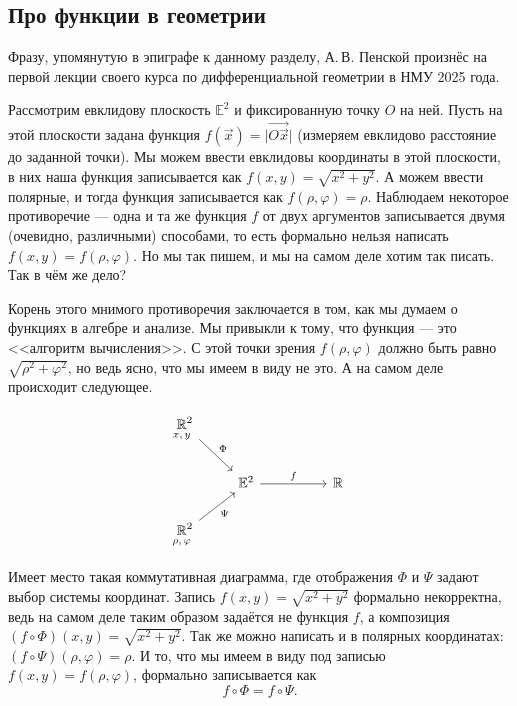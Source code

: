 \subsection{Про функции в геометрии}

Фразу, упомянутую в эпиграфе к данному разделу, А.\,В. Пенской произнёс на первой лекции своего курса по дифференциальной геометрии в НМУ 2025 года.

Рассмотрим евклидову плоскость\footnotemark{} $\mathbb{E}^2$ и фиксированную точку $O$ на ней. Пусть на этой плоскости задана функция $f(\vec{x}) = \big|\overrightarrow{O\vec{x}}\big|$ (измеряем евклидово расстояние до заданной точки). Мы можем ввести евклидовы координаты в этой плоскости, в них наша функция записывается как $f(x, y) = \sqrt{x^2 + y^2}$. А можем ввести полярные, и тогда функция записывается как $f(\rho, \varphi) = \rho$. Наблюдаем некоторое противоречие --- одна и та же функция $f$ от двух аргументов записывается двумя (очевидно, различными) способами, то есть формально нельзя написать $f(x, y) = f(\rho, \varphi)$. Но мы так пишем, и мы на самом деле хотим так писать. Так в чём же дело?


Корень этого мнимого противоречия заключается в том, как мы думаем о функциях в алгебре и анализе. Мы привыкли к тому, что функция --- это <<алгоритм вычисления>>. С этой точки зрения $f(\rho, \varphi)$ должно быть равно $\sqrt{\rho^2 + \varphi^2}$, но ведь ясно, что мы имеем в виду не это. А на самом деле происходит следующее.

%
\[\begin{tikzcd}
	{\underset{\mathclap{x,\,y}}{\mathbb{R}}^2} \\
	& {\mathbb{E}^2} && {\mathbb{R}} \\
	{\underset{\mathclap{\rho,\,\varphi}}{\mathbb{R}}^2}
	\arrow["\Phi", from=1-1, to=2-2]
	\arrow["f", from=2-2, to=2-4]
	\arrow["\Psi"', from=3-1, to=2-2]
\end{tikzcd}\]
%

Имеет место такая коммутативная диаграмма, где отображения $\Phi$ и $\Psi$ задают выбор системы координат. Запись $f(x, y) = \sqrt{x^2 + y^2}$ формально некорректна, ведь на самом деле таким образом задаётся не функция $f$, а композиция $(f \circ \Phi)(x, y) = \sqrt{x^2 + y^2}$. Так же можно написать и в полярных координатах: $(f \circ \Psi)(\rho, \varphi) = \rho$. И то, что мы имеем в виду под записью $f(x, y) = f(\rho, \varphi)$, формально записывается как
\[
	f \circ \Phi = f \circ \Psi.
\]

